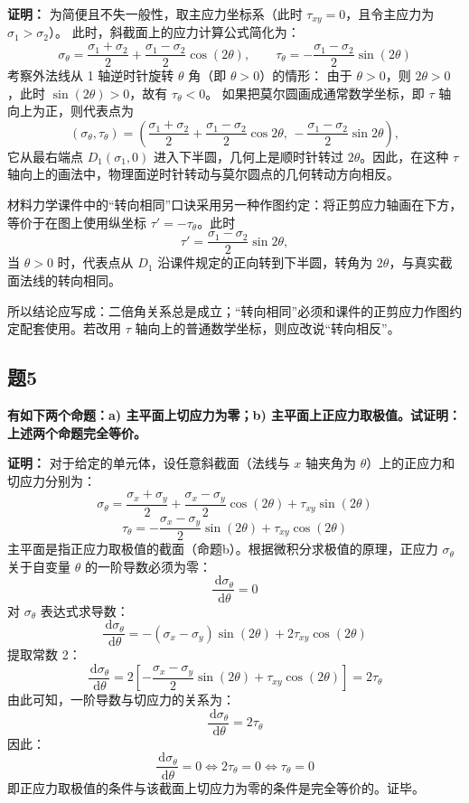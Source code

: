 \documentclass[UTF8,fontset=windows]{ctexart}
\newcommand{\diff}{\,\mathrm{d}}
\begin{document}
\textbf{证明：}
为简便且不失一般性，取主应力坐标系（此时 $\tau_{xy} = 0$，且令主应力为 $\sigma_1 > \sigma_2$）。
此时，斜截面上的应力计算公式简化为：
\[
    \sigma_\theta = \frac{\sigma_1 + \sigma_2}{2} + \frac{\sigma_1 - \sigma_2}{2} \cos(2\theta), \qquad \tau_\theta = -\frac{\sigma_1 - \sigma_2}{2} \sin(2\theta)
\]
考察外法线从 1 轴逆时针旋转 $\theta$ 角（即 $\theta > 0$）的情形：
由于 $\theta > 0$，则 $2\theta > 0$，此时 $\sin(2\theta) > 0$，故有 $\tau_\theta < 0$。
如果把莫尔圆画成通常数学坐标，即 $\tau$ 轴向上为正，则代表点为
\[
    (\sigma_\theta,\tau_\theta)
    =
    \left(
    \frac{\sigma_1+\sigma_2}{2}
    +\frac{\sigma_1-\sigma_2}{2}\cos2\theta,\,
    -\frac{\sigma_1-\sigma_2}{2}\sin2\theta
    \right),
\]
它从最右端点 $D_1(\sigma_1,0)$ 进入下半圆，几何上是顺时针转过 $2\theta$。因此，在这种 $\tau$ 轴向上的画法中，物理面逆时针转动与莫尔圆点的几何转动方向相反。

材料力学课件中的“转向相同”口诀采用另一种作图约定：将正剪应力轴画在下方，等价于在图上使用纵坐标 $\tau'=-\tau_\theta$。此时
\[
    \tau'=\frac{\sigma_1-\sigma_2}{2}\sin2\theta,
\]
当 $\theta>0$ 时，代表点从 $D_1$ 沿课件规定的正向转到下半圆，转角为 $2\theta$，与真实截面法线的转向相同。

所以结论应写成：二倍角关系总是成立；“转向相同”必须和课件的正剪应力作图约定配套使用。若改用 $\tau$ 轴向上的普通数学坐标，则应改说“转向相反”。

\subsection*{题5}
\textbf{有如下两个命题：a) 主平面上切应力为零；b) 主平面上正应力取极值。试证明：上述两个命题完全等价。}

\textbf{证明：}
对于给定的单元体，设任意斜截面（法线与 $x$ 轴夹角为 $\theta$）上的正应力和切应力分别为：
\[
    \sigma_\theta = \frac{\sigma_x + \sigma_y}{2} + \frac{\sigma_x - \sigma_y}{2} \cos(2\theta) + \tau_{xy} \sin(2\theta)
\]
\[
    \tau_\theta = -\frac{\sigma_x - \sigma_y}{2} \sin(2\theta) + \tau_{xy} \cos(2\theta)
\]
主平面是指正应力取极值的截面（命题b）。根据微积分求极值的原理，正应力 $\sigma_\theta$ 关于自变量 $\theta$ 的一阶导数必须为零：
\[
    \frac{\diff \sigma_\theta}{\diff \theta} = 0
\]
对 $\sigma_\theta$ 表达式求导数：
\[
    \frac{\diff \sigma_\theta}{\diff \theta} = -(\sigma_x - \sigma_y) \sin(2\theta) + 2\tau_{xy} \cos(2\theta)
\]
提取常数 2：
\[
    \frac{\diff \sigma_\theta}{\diff \theta} = 2 \left[ -\frac{\sigma_x - \sigma_y}{2} \sin(2\theta) + \tau_{xy} \cos(2\theta) \right] = 2\tau_\theta
\]
由此可知，一阶导数与切应力的关系为：
\[
    \frac{\diff \sigma_\theta}{\diff \theta} = 2\tau_\theta
\]
因此：
\[
    \frac{\diff \sigma_\theta}{\diff \theta} = 0 \iff 2\tau_\theta = 0 \iff \tau_\theta = 0
\]
即正应力取极值的条件与该截面上切应力为零的条件是完全等价的。证毕。
\end{document}
